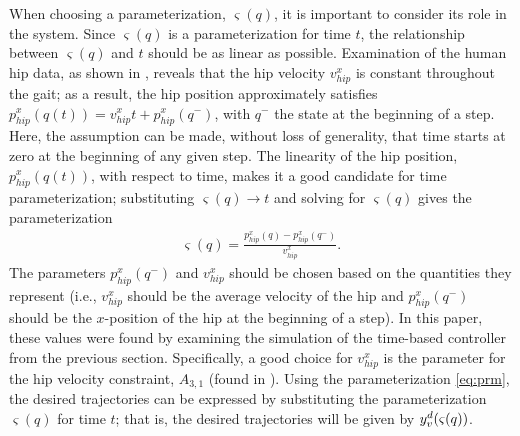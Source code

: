 When choosing a parameterization, $\varsigma(q)$, it is important to consider its role in the system. Since $\varsigma(q)$ is a parameterization for time $t$, the relationship between $\varsigma(q)$ and $t$ should be as linear as possible. Examination of the human hip data, as shown in , reveals that the hip velocity $v_{\mathit{hip}}^{x}$ is constant throughout the gait; as a result, the hip position approximately satisfies $p_{\mathit{hip}}^{x}(q(t)) = v_{\mathit{hip}}^x t + p_\mathit{hip}^x(q^-)$, with $q^-$ the state at the beginning of a step. Here, the assumption can be made, without loss of generality, that time starts at zero at the beginning of any given step. The linearity of the hip position, $p_{\mathit{hip}}^{x}(q(t))$, with respect to time, makes it a good candidate for time parameterization; substituting $\varsigma(q) \to t$ and solving for $\varsigma(q)$ gives the parameterization
\begin{align}
  \label{eq:prm}
  \varsigma(q) = \frac{p_{\mathit{hip}}^{x}(q) - p_{\mathit{hip}}^{x}(q^-)}{v_{\mathit{hip}}^{x}}.
\end{align}
The parameters $p_{\mathit{hip}}^{x}(q^-)$ and $v_{\mathit{hip}}^{x}$ should be
chosen based on the quantities they represent (i.e., $v_{\mathit{hip}}^{x}$
should be the average velocity of the hip and $p_{\mathit{hip}}^{x}(q^-)$ should
be the $x$-position of the hip at the beginning of a step).
%
In this paper, these values were found by examining the simulation of the
time-based controller from the previous section.
%
Specifically, a good choice for $v_{\mathit{hip}}^{x}$ is the parameter for the
hip velocity constraint, $A_{3,1}$ (found in ).
%
Using the parameterization \eqref{eq:prm}, the desired trajectories can be
expressed by substituting the parameterization $\varsigma(q)$ for time $t$;
%
that is, the desired trajectories will be given by $y_{v}^{d}(\varsigma(q))$.


